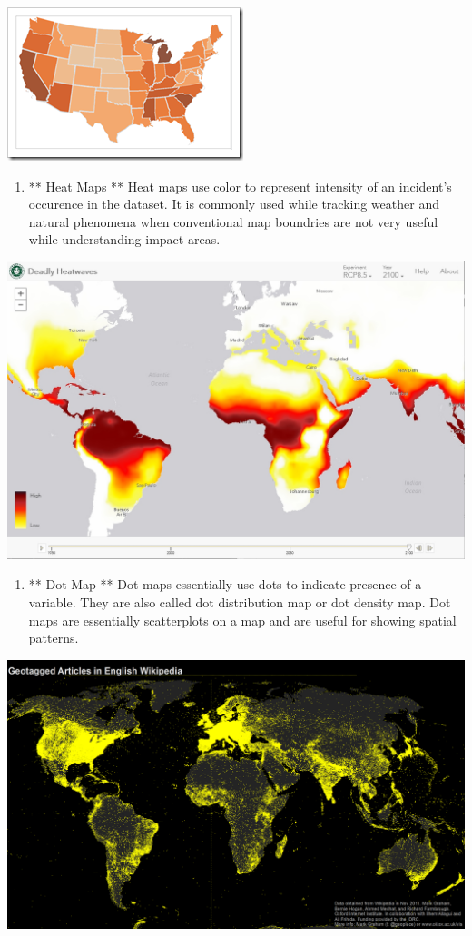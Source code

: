 \documentclass[]{book}
\providecommand{\tightlist}{%
  \setlength{\itemsep}{0pt}\setlength{\parskip}{0pt}}
\begin{document}
\includegraphics{images/cloropleth_map1.png}

\begin{enumerate}
\def\labelenumi{\arabic{enumi}.}
\setcounter{enumi}{1}
\tightlist
\item
  ** Heat Maps **
  Heat maps use color to represent intensity of an incident's occurence in the dataset. It is commonly used while tracking weather and natural phenomena when conventional map boundries are not very useful while understanding impact areas.
\end{enumerate}

\includegraphics{images/heat_map1.jpg}

\begin{enumerate}
\def\labelenumi{\arabic{enumi}.}
\setcounter{enumi}{2}
\tightlist
\item
  ** Dot Map **
  Dot maps essentially use dots to indicate presence of a variable. They are also called dot distribution map or dot density map. Dot maps are essentially scatterplots on a map and are useful for showing spatial patterns.
\end{enumerate}

\includegraphics{images/dot_map1.png}
\end{document}

